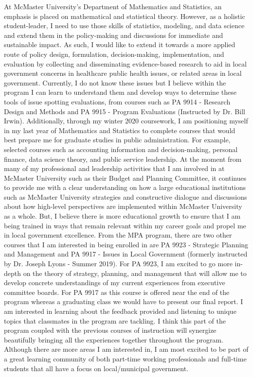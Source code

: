 \documentclass[11pt, a4paper]{awesome-cv}
\begin{document}
\begin{cvletter}
At McMaster University's Department of Mathematics and Statistics, an emphasis is placed on mathematical and statistical theory. However, as a holistic student-leader, I need to use those skills of statistics, modeling, and data science and extend them in the policy-making and discussions for immediate and sustainable impact. As such, I would like to extend it towards a more applied route of policy design, formulation, decision-making, implementation, and evaluation by collecting and disseminating evidence-based research to aid in local government concerns in healthcare public health issues, or related areas in local government. Currently, I do not know these issues but I believe within the program I can learn to understand them and develop ways to determine these tools of issue spotting evaluations, from courses such as PA 9914 - Research Design and Methods and PA 9915 - Program Evaluations (Instructed by Dr. Bill Irwin). Additionally, through my winter 2020 coursework, I am positioning myself in my last year of Mathematics and Statistics to complete courses that would best prepare me for graduate studies in public administration. For example, selected courses such as accounting information and decision-making, personal finance, data science theory, and public service leadership. At the moment from many of my professional and leadership activities that I am involved in at McMaster University such as their Budget and Planning Committee, it continues to provide me with a clear understanding on how a large educational institutions such as McMaster University strategies and constructive dialogue and discussions about how high-level perspectives are implemented within McMaster University as a whole. But, I believe there is more educational growth to ensure that I am being trained in ways that remain relevant within my career goals and propel me in local government excellence. From the MPA program, there are two other courses that I am interested in being enrolled in are PA 9923 - Strategic Planning and Management and PA 9917 - Issues in Local Government (formerly instructed by Dr. Joseph Lyons - Summer 2019). For PA 9923, I am excited to go more in-depth on the theory of strategy, planning, and management that will allow me to develop concrete understandings of my current experiences from executive committee boards. For PA 9917 as this course is offered near the end of the program whereas a graduating class we would have to present our final report. I am interested in learning about the feedback provided and listening to unique topics that classmates in the program are tackling. I think this part of the program coupled with the previous courses of instruction will synergize beautifully bringing all the experiences together throughout the program. Although there are more areas I am interested in, I am most excited to be part of a great learning community of both part-time working professionals and full-time students that all have a focus on local/municipal government.


\end{cvletter}
\end{document}
